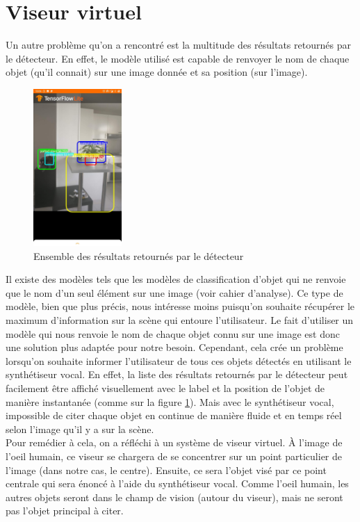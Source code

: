 \documentclass[UTF8]{EPURapport}
\begin{document}
\section{Viseur virtuel}

Un autre problème qu'on a rencontré est la multitude des résultats retournés par le détecteur. En effet, le modèle utilisé est capable de renvoyer le nom de chaque objet (qu'il connait) sur une image donnée et sa position (sur l'image). \\
\newpage

\begin{figure}[h!]
\centering
  \includegraphics[width=0.3\textwidth]{images/multiobj.jpg}
  \caption{Ensemble des résultats retournés par le détecteur}
  \label{fig:multiobj}
\end{figure}

Il existe des modèles tels que les modèles de classification d'objet qui ne renvoie que le nom d'un seul élément sur une image (voir cahier d'analyse). Ce type de modèle, bien que plus précis, nous intéresse moins puisqu'on souhaite récupérer le maximum d'information sur la scène qui entoure l'utilisateur. Le fait d'utiliser un modèle qui nous renvoie le nom de chaque objet connu sur une image est donc une solution plus adaptée pour notre besoin. Cependant, cela crée un problème lorsqu'on souhaite informer l'utilisateur de tous ces objets détectés en utilisant le synthétiseur vocal. En effet, la liste des résultats retournés par le détecteur peut facilement être affiché visuellement avec le label et la position de l'objet de manière instantanée (comme sur la figure \ref{fig:multiobj}). Mais avec le synthétiseur vocal, impossible de citer chaque objet en continue de manière fluide et en temps réel selon l'image qu'il y a sur la scène. \\

Pour remédier à cela, on a réfléchi à un système de viseur virtuel. À l'image de l'oeil humain, ce viseur se chargera de se concentrer sur un point particulier de l'image (dans notre cas, le centre). Ensuite, ce sera l'objet visé par ce point centrale qui sera énoncé à l'aide du synthétiseur vocal. Comme l'oeil humain, les autres objets seront dans le champ de vision (autour du viseur), mais ne seront pas l'objet principal à citer. \\
\newpage
\end{document}
